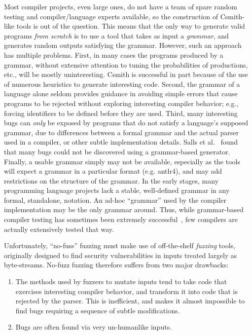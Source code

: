 \begin{sloppypar}
 Most compiler projects, even large ones, do not have a team
of spare random testing and compiler/language experts available, so the construction of
Csmith-like tools is out of the question.  This means that the only
way to generate valid programs \emph{from scratch} is to use a tool that takes as
input a \emph{grammar}, and generates random outputs
satisfying the grammar.   However, such an approach has multiple problems.
First, in many cases the programs produced by a grammar, without
extensive attention to tuning the probabilities of productions, etc., will be mostly uninteresting.
Csmith is successful in part because of the use of numerous heuristics
to generate interesting code.  Second, the grammar of a language alone
seldom provides guidance in avoiding simple errors that cause programs
to be rejected without exploring interesting compiler behavior; e.g., forcing identifiers to be
defined before they are used.  Third, many interesting bugs can \emph{only}
be exposed by programs that do not satisfy a language's supposed grammar, due to differences between a formal grammar and the actual
parser used in a compiler, or other subtle implementation details.
Salls et al.~\cite{Salls2021TokenLevel} found that many bugs could not be discovered using a
grammar-based generator.
Finally, a usable grammar simply may not be available, especially as the
tools will expect a grammar in a particular format (e.g. antlr4), and may add
restrictions on the structure of the grammar.  In the early stages,
many programming language projects lack a stable, well-defined
grammar in any formal, standalone, notation.  An ad-hoc ``grammar'' used by the compiler implementation may be the
only grammar around.  Thus, while grammar-based compiler
testing has sometimes been extremely successful~\cite{LangFuzz}, few compilers are actually
extensively tested that way.
\end{sloppypar}

Unfortunately, ``no-fuss''
fuzzing must make use of off-the-shelf \emph{fuzzing} tools,
originally designed to find security vulnerabilities in inputs treated
largely as byte-streams.  No-fuzz
fuzzing therefore
suffers from two major drawbacks:

\begin{enumerate}
\item The methods used by fuzzers to mutate inputs tend to take code that exercises interesting
  compiler behavior, and transform it into code that is rejected by
  the parser.  This is inefficient, and makes it
  almost impossible to find bugs requiring a sequence of subtle
  modifications.
  \item Bugs are often
    found via very un-humanlike inputs.
  \end{enumerate}

